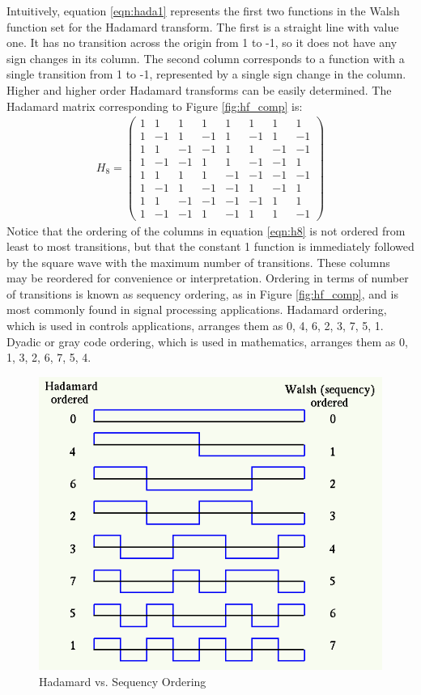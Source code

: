 Intuitively, equation \ref{eqn:hada1} represents the first two functions in the Walsh function set for the Hadamard transform. The first is a straight line with value one. It has no transition across the origin from 1 to -1, so it does not have any sign changes in its column. The second column corresponds to a function with a single transition from 1 to -1, represented by a single sign change in the column. Higher and higher order Hadamard transforms can be easily determined. The Hadamard matrix corresponding to Figure \ref{fig:hf_comp} is:
\begin{align}
H_8=\left(\begin{array}{cccccccc} 1 & 1 & 1 & 1 & 1 & 1 & 1 & 1\\ 1 & -1 & 1 & -1 & 1 & -1 & 1 & -1\\ 1 & 1 & -1 & -1 & 1 & 1 & -1 & -1\\ 1 & -1 & -1 & 1 & 1 & -1 & -1 & 1\\ 1 & 1 & 1 & 1 & -1 & -1 & -1 & -1\\ 1 & -1 & 1 & -1 & -1 & 1 & -1 & 1\\ 1 & 1 & -1 & -1 & -1 & -1 & 1 & 1\\ 1 & -1 & -1 & 1 & -1 & 1 & 1 & -1 \end{array}\right) \label{eqn:h8}
\end{align}
Notice that the ordering of the columns in equation \ref{eqn:h8} is not ordered from least to most transitions, but that the constant 1 function is immediately followed by the square wave with the maximum number of transitions. These columns may be reordered for convenience or interpretation. Ordering in terms of number of transitions is known as sequency ordering, as in Figure \ref{fig:hf_comp}, and is most commonly found in signal processing applications.  Hadamard ordering, which is used in controls applications, arranges them as 0, 4, 6, 2, 3, 7, 5, 1. Dyadic or gray code ordering, which is used in mathematics, arranges them as 0, 1, 3, 2, 6, 7, 5, 4.
\begin{figure}[]
    \centering
    \includegraphics[scale=0.5]{../../../figures/wht_waveform_1.png} 
    \caption{Hadamard vs. Sequency Ordering}
    \label{fig:ordering}
\end{figure}
